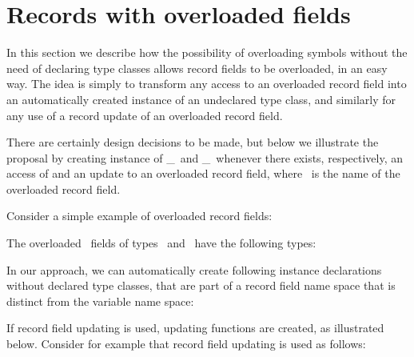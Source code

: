 \section{Records with overloaded fields}
\label{sec:overloaded-record-fields}

In this section we describe how the possibility of overloading symbols
without the need of declaring type classes allows record fields to be
overloaded, in an easy way. The idea is simply to transform any access
to an overloaded record field into an automatically created instance
of an undeclared type class, and similarly for any use of a record
update of an overloaded record field. 

There are certainly design decisions to be made, but below we
illustrate the proposal by creating instance of \get\_\fieldname\ and
\update\_\fieldname\ whenever there exists, respectively, an access of
and an update to an overloaded record field, where \fieldname\ is the
name of the overloaded record field.

Consider a simple example of overloaded record fields: 

\progb{\data\ \Address\ \= = \Address\ \= \{ \id\ :: \Int, \address\ \= :: \String\ \= \kill
\data\ \Person\  \> = \Person\  \> \{ \id\ :: \Int, \name\    \> :: \String\ \>\}\\
\data\ \Address\ \> = \Address\ \> \{ \id\ :: \Int, \address\ \> :: \String\ \>\}
}

The overloaded \id\ fields of types \Person\ and \Address\ have the
following types:

\progb{\id\ :: \Address\ \= \kill
\id\ :: \Person\  \>$\rightarrow$ \Int\\
\id\ :: \Address\ \>$\rightarrow$ \Int
}

In our approach, we can automatically create following instance
declarations without declared type classes, that are part of a record
field name space that is distinct from the variable name space:

\progb{
\get\_\id\ :: \Person\ $\rightarrow$ \Int\\
\instance\ \get\_\id\ (\Person\ \id\ \_\ )  = \id\\ \\

\get\_\id\ :: \Address\ $\rightarrow$ \Int\\
\instance\ \get\_\id\ (\Address\ \id\ \_\ ) = \id}

If record field updating is used, updating functions are created, as
illustrated below. Consider for example that record field updating is
used as follows:

